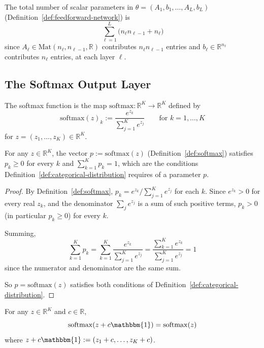 		\begin{remark}
			\label{rem:parameter-count}
			The total number of scalar parameters in $\theta=(A_1,b_1,\dots,A_L,b_L)$ (Definition~\ref{def:feedforward-network}) is
			\[
				\sum_{\ell=1}^{L} \big(n_\ell n_{\ell-1} + n_\ell\big)
			\]
			since $A_\ell\in\mathrm{Mat}(n_\ell,n_{\ell-1},\mathbb{R})$ contributes $n_\ell n_{\ell-1}$ entries and $b_\ell\in\mathbb{R}^{n_\ell}$ contributes $n_\ell$ entries, at each layer $\ell$.
		\end{remark}
		
	\subsection{The Softmax Output Layer}
		
		\begin{definition}[Softmax]
			\label{def:softmax}
			The softmax function is the map $\mathrm{softmax}:\mathbb{R}^K\to\mathbb{R}^K$ defined by
			\[
				\mathrm{softmax}(z)_k := \frac{e^{z_k}}{\sum_{j=1}^K e^{z_j}} \qquad \text{for } k=1,\dots,K
			\]
			for $z=(z_1,\dots,z_K)\in\mathbb{R}^K$.
		\end{definition}
		
		\begin{proposition}
			\label{prop:softmax-simplex}
			For any $z\in\mathbb{R}^K$, the vector $p:=\mathrm{softmax}(z)$ (Definition~\ref{def:softmax}) satisfies $p_k\ge0$ for every $k$ and $\sum_{k=1}^Kp_k=1$, which are the conditions Definition~\ref{def:categorical-distribution} requires of a parameter $p$.
		\end{proposition}
		
		\begin{proof}
			By Definition~\ref{def:softmax}, $p_k = e^{z_k}/\sum_{j=1}^Ke^{z_j}$ for each $k$. Since $e^{z_k}>0$ for every real $z_k$, and the denominator $\sum_je^{z_j}$ is a sum of such positive terms, $p_k>0$ (in particular $p_k\ge0$) for every $k$.
			
			Summing,
			\[
				\sum_{k=1}^K p_k = \sum_{k=1}^K \frac{e^{z_k}}{\sum_{j=1}^Ke^{z_j}} = \frac{\sum_{k=1}^Ke^{z_k}}{\sum_{j=1}^Ke^{z_j}} = 1
			\]
			since the numerator and denominator are the same sum.
			
			So $p=\mathrm{softmax}(z)$ satisfies both conditions of Definition~\ref{def:categorical-distribution}.
		\end{proof}
		
		\begin{proposition}
			\label{prop:softmax-shift-invariance}
			For any $z\in\mathbb{R}^K$ and $c\in\mathbb{R}$,
			\[
				\mathrm{softmax}(z+c\mathbbm{1}) = \mathrm{softmax}(z)
			\]
			where $z+c\mathbbm{1} := (z_1+c,\dots,z_K+c)$.
		\end{proposition}
		
